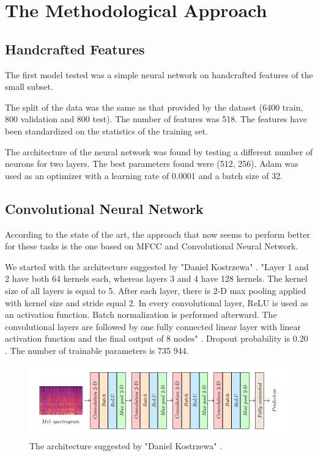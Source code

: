 \section{The Methodological Approach}


\subsection{Handcrafted Features}
The first model tested was a simple neural network on handcrafted features of the small subset.

The split of the data was the same as that provided by the dataset (6400 train, 800 validation and 800 test).
The number of features was 518. The features have been standardized on the statistics of the training set.

The architecture of the neural network was found by testing a different number of neurons for two layers. 
The best parameters found were (512, 256).
Adam was used as an optimizer with a learning rate of 0.0001 and a batch size of 32.

\subsection{Convolutional Neural Network}
According to the state of the art\cite{zeng2019spectrogram}, the approach that now seems to perform better for these tasks is the one based on MFCC and Convolutional Neural Network. 

We started with the architecture suggested by "Daniel Kostrzewa" \cite{kostrzewa2021music}.
"Layer 1 and 2 have both 64 kernels each, whereas layers 3 and 4 have 128 kernels. The kernel size of all layers is equal to 5. After each layer, there is 2-D max pooling applied with kernel size and stride equal 2. In every convolutional layer, ReLU is used as an activation function. Batch normalization is performed afterward. The convolutional layers are followed by one fully connected linear layer with linear activation function and the final output of 8 nodes" \cite{kostrzewa2021music}. Dropout probability is 0.20 . The number of trainable parameters is 735 944.

\begin{figure}[ht]
\centering
\includegraphics[scale=0.6]{images/CNN-architecture.png}
\caption{The architecture suggested by "Daniel Kostrzewa" \cite{kostrzewa2021music}.}
\label{fig:CNN-architecture}
\end{figure}

